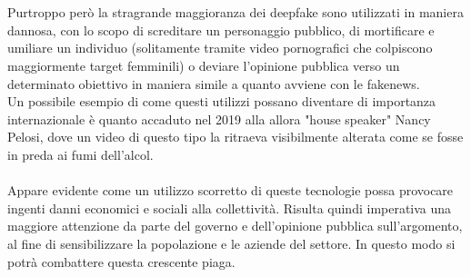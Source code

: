 \documentclass[12pt, a4paper]{article}
\begin{document}
\\\\
Purtroppo però la stragrande maggioranza dei deepfake sono utilizzati in maniera dannosa, con lo scopo di screditare un personaggio pubblico, di mortificare e umiliare un individuo (solitamente tramite video pornografici che colpiscono maggiormente target femminili) o deviare l'opinione pubblica verso un determinato obiettivo in maniera simile a quanto avviene con le fakenews.
\\
Un possibile esempio di come questi utilizzi possano diventare di importanza internazionale è quanto accaduto nel 2019 alla allora "house speaker" Nancy Pelosi, dove un video di questo tipo la ritraeva visibilmente alterata come se fosse in preda ai fumi dell'alcol\cite{FakeVideoNancyPelosi}.
\\\\%
Appare evidente come un utilizzo scorretto di queste tecnologie possa provocare ingenti danni economici e sociali alla collettività. Risulta quindi imperativa una maggiore attenzione da parte del governo e dell'opinione pubblica sull'argomento, al fine di sensibilizzare la popolazione e le aziende del settore. In questo modo si potrà combattere questa crescente piaga.



\newpage
\end{document}
